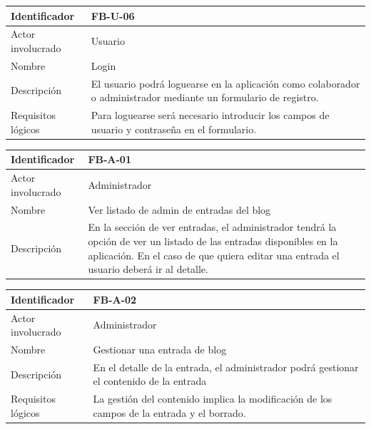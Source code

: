 \begin{table}[h!]
\centering
\begin{tabular}{|p{3cm}|p{10cm}|}
\hline
Identificador & FB-U-06 \\ \hline
Actor involucrado & Usuario \\ \hline
Nombre & Login\\ \hline
Descripción & El usuario podrá loguearse en la aplicación como colaborador o administrador mediante un formulario de registro.  \\ \hline
Requisitos lógicos & Para loguearse será necesario introducir los campos de usuario y contraseña en el formulario.\\ \hline
\end{tabular}
\end{table}

\begin{table}[h!]
\centering
\begin{tabular}{|p{3cm}|p{10cm}|}
\hline
Identificador & FB-A-01 \\ \hline
Actor involucrado & Administrador \\ \hline
Nombre & Ver listado de admin de entradas del blog\\ \hline
Descripción & En la sección de ver entradas, el administrador tendrá la opción de ver un listado de las entradas disponibles en la aplicación. En el caso de que quiera editar una entrada el usuario deberá ir al detalle. \\ \hline

\end{tabular}
\end{table}

\begin{table}[h!]
\centering
\begin{tabular}{|p{3cm}|p{10cm}|}
\hline
Identificador & FB-A-02 \\ \hline
Actor involucrado & Administrador \\ \hline
Nombre & Gestionar una entrada de blog\\ \hline
Descripción & En el detalle de la entrada, el administrador podrá gestionar el contenido de la entrada  \\ \hline
Requisitos lógicos & La gestión del contenido implica la modificación de los campos de la entrada y el borrado. \\ \hline
\end{tabular}
\end{table}

